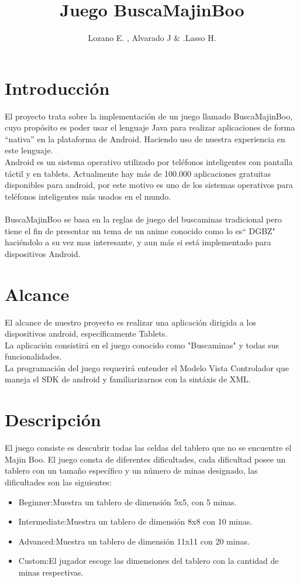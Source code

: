 \documentclass[11pt]{article} %
\title{Juego BuscaMajinBoo}
\author{Lozano E. , Alvarado J \& .Lasso H.}
\begin{document}
\maketitle

\section{Introducción}
El proyecto trata sobre la implementación  de un juego llamado BuscaMajinBoo, cuyo propósito es poder usar el lenguaje Java  para  realizar aplicaciones de forma ``nativa” en la plataforma de Android. Haciendo uso de nuestra experiencia en este lenguaje.\\
Android es un sistema operativo utilizado por  teléfonos inteligentes con pantalla táctil y en tablets. Actualmente hay más de 100.000  aplicaciones gratuitas disponibles para android, por este motivo es uno de los sistemas operativos para teléfonos inteligentes  más usados en el mundo.\\ \\
BuscaMajinBoo se basa en la reglas de juego del buscaminas tradicional pero tiene el fin de presentar un tema de un anime conocido como lo es`` DGBZ" haciéndolo a su vez mas interesante, y aun más si está implementado para dispositivos Android.

\section{Alcance}
El alcance de nuestro proyecto es realizar una aplicación dirigida a los dispositivos android, específicamente Tablets. \\
La aplicación consistirá en el juego conocido como "Buscaminas" y todas sus funcionalidades.\\
La programación del juego requerirá entender el Modelo Vista Controlador que maneja el SDK de android y familiarizarnos con la sintáxis de XML. 

\section{Descripción}
El juego consiste es descubrir todas las celdas del tablero que no se encuentre el Majin  Boo.
El juego consta de  diferentes dificultades, cada dificultad posee un tablero con un tamaño específico y un número de minas designado, las dificultades son las siguientes:\\
\begin{itemize}
\item Beginner:Muestra un tablero de dimensión 5x5, con 5 minas.
\item Intermediate:Muestra un tablero de dimensión 8x8 con 10 minas.
\item Advanced:Muestra un tablero de dimensión 11x11 con 20 minas.
\item  Custom:El jugador escoge las dimensiones del tablero con la cantidad de minas respectivas.
\end{itemize}
\end{document}

